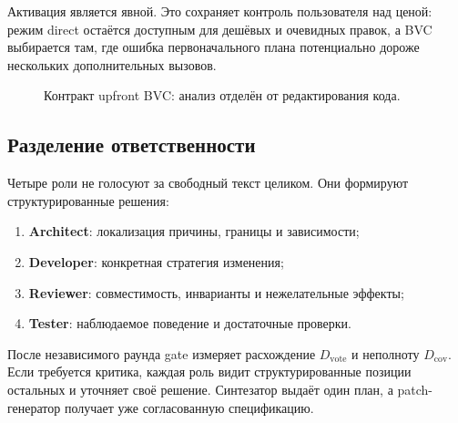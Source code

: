 \documentclass[11pt]{article}
\begin{document}
Активация является явной. Это сохраняет контроль пользователя над ценой:
режим direct остаётся доступным для дешёвых и очевидных правок, а BVC
выбирается там, где ошибка первоначального плана потенциально дороже
нескольких дополнительных вызовов.

\begin{figure}[H]
\centering
{}
\caption{Контракт upfront BVC: анализ отделён от редактирования кода.}
\label{fig:workflow}
\end{figure}

\subsection{Разделение ответственности}

Четыре роли не голосуют за свободный текст целиком. Они формируют
структурированные решения:
\begin{enumerate}
  \item \textbf{Architect}: локализация причины, границы и зависимости;
  \item \textbf{Developer}: конкретная стратегия изменения;
  \item \textbf{Reviewer}: совместимость, инварианты и нежелательные эффекты;
  \item \textbf{Tester}: наблюдаемое поведение и достаточные проверки.
\end{enumerate}
После независимого раунда gate измеряет расхождение \(D_{\mathrm{vote}}\) и
неполноту \(D_{\mathrm{cov}}\). Если требуется критика, каждая роль видит
структурированные позиции остальных и уточняет своё решение. Синтезатор
выдаёт один план, а patch-генератор получает уже согласованную спецификацию.
\end{document}
